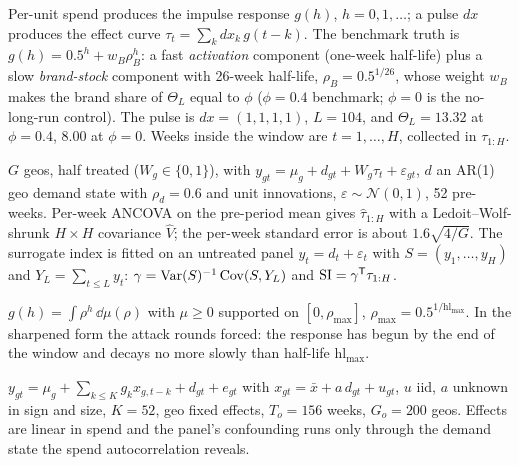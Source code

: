 \begin{definition}
\label{surr:def:model}
Per-unit spend produces the impulse response $g(h)$, $h = 0, 1, \ldots$; a pulse $dx$ produces the effect curve $\tau_t = \sum_k dx_k\,g(t - k)$. The benchmark truth is $g(h) = 0.5^h + w_B\rho_B^h$: a fast \emph{activation} component (one-week half-life) plus a slow \emph{brand-stock} component with 26-week half-life, $\rho_B = 0.5^{1/26}$, whose weight $w_B$ makes the brand share of $\Theta_L$ equal to $\phi$ ($\phi = 0.4$ benchmark; $\phi = 0$ is the no-long-run control). The pulse is $dx = (1, 1, 1, 1)$, $L = 104$, and $\Theta_L = 13.32$ at $\phi = 0.4$, $8.00$ at $\phi = 0$. Weeks inside the window are $t = 1, \ldots, H$, collected in $\tau_{1:H}$.
\end{definition}

\begin{definition}
\label{surr:def:exp}
$G$ geos, half treated ($W_g \in \{0, 1\}$), with $y_{gt} = \mu_g + d_{gt} + W_g\tau_t + \varepsilon_{gt}$, $d$ an AR(1) geo demand state with $\rho_d = 0.6$ and unit innovations, $\varepsilon \sim \mathcal N(0, 1)$, 52 pre-weeks. Per-week ANCOVA on the pre-period mean gives $\hat\tau_{1:H}$ with a Ledoit--Wolf-shrunk $H \times H$ covariance $\hat V$; the per-week standard error is about $1.6\sqrt{4/G}$. The surrogate index is fitted on an untreated panel $y_t = d_t + \varepsilon_t$ with $S = (y_1, \ldots, y_H)$ and $Y_L = \sum_{t \le L}y_t$: $\gamma = \operatorname{Var}(S)^{-1}\operatorname{Cov}(S, Y_L)$ and $\mathrm{SI} = \gamma^{\mathsf{T}}\tau_{1:H}$.
\end{definition}

\begin{assumption}
\label{surr:ass:cm}
$g(h) = \int\rho^h\,\dd\mu(\rho)$ with $\mu \ge 0$ supported on $[0, \rho_{\max}]$, $\rho_{\max} = 0.5^{1/\mathrm{hl}_{\max}}$. In the sharpened form the attack rounds forced: the response has begun by the end of the window and decays no more slowly than half-life $\mathrm{hl}_{\max}$.
\end{assumption}

\begin{assumption}
\label{surr:ass:panel}
$y_{gt} = \mu_g + \sum_{k \le K}g_k x_{g,t-k} + d_{gt} + e_{gt}$ with $x_{gt} = \bar x + a\,d_{gt} + u_{gt}$, $u$ iid, $a$ unknown in sign and size, $K = 52$, geo fixed effects, $T_o = 156$ weeks, $G_o = 200$ geos. Effects are linear in spend and the panel's confounding runs only through the demand state the spend autocorrelation reveals.
\end{assumption}

